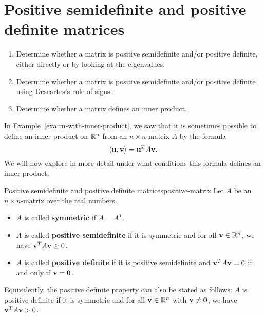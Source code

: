 \section{Positive semidefinite and positive definite matrices}

\begin{outcome}
  \begin{enumerate}
  \item Determine whether a matrix is positive semidefinite and/or
    positive definite, either directly or by looking at the
    eigenvalues.
  \item Determine whether a matrix is positive semidefinite and/or
    positive definite using Descartes's rule of signs.
  \item Determine whether a matrix defines an inner product.
  \end{enumerate}
\end{outcome}

In Example~\ref{exa:rn-with-inner-product}, we saw that it is
sometimes possible to define an inner product on $\mathbb{R}^n$ from an
$n\times n$-matrix $A$ by the formula
\begin{equation*}
  \iprod{\vect{u},\vect{v}} = \vect{u}^T A \vect{v}.
\end{equation*}
We will now explore in more detail under what conditions this formula
defines an inner product.

\begin{definition}{Positive semidefinite and positive definite matrices}{positive-matrix}
  Let $A$ be an $n\times n$-matrix over the real numbers.
  \begin{itemize}
  \item $A$ is called \textbf{symmetric}%
     if $A=A^T$.
  \item $A$ is called \textbf{positive semidefinite}%
     if it is symmetric and for all
    $\vect{v}\in\R^n$, we have $\vect{v}^TA\vect{v}\geq 0$.
  \item $A$ is called \textbf{positive definite}%
     if it is positive semidefinite
    and $\vect{v}^TA\vect{v}=0$ if and only if $\vect{v}=\vect{0}$.
\end{itemize}
\end{definition}

Equivalently, the positive definite property can also be stated as
follows: $A$ is positive definite if it is symmetric and for all
$\vect{v}\in\R^n$ with $\vect{v}\neq\vect{0}$, we have
$\vect{v}^TA\vect{v}>0$.


